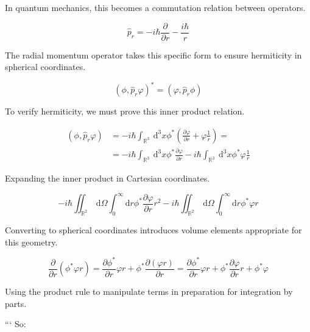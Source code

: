 \documentclass[italian]{HKNdocument}
\begin{document}
In quantum mechanics, this becomes a commutation relation between operators.

\begin{equation*}
\hat{p}_{r}=-i \hbar \frac{\partial}{\partial r}-\frac{i \hbar}{r} \tag{9.16}
\end{equation*}

The radial momentum operator takes this specific form to ensure hermiticity in spherical coordinates.

\begin{equation*}
\left(\phi, \hat{p}_{r} \varphi\right)^{*}=\left(\varphi, \hat{p}_{r} \phi\right) \tag{9.17}
\end{equation*}

To verify hermiticity, we must prove this inner product relation.

\begin{align*}
\left(\phi, \hat{p}_{r} \varphi\right) & =-i \hbar \int_{\mathbb{R}^{3}} \mathrm{~d}^{3} x \phi^{*}\left(\frac{\partial \varphi}{\partial r}+\varphi \frac{1}{r}\right)=  \tag{9.18}\\
& =-i \hbar \int_{\mathbb{R}^{3}} \mathrm{~d}^{3} x \phi^{*} \frac{\partial \varphi}{\partial r}-i \hbar \int_{\mathbb{R}^{3}} \mathrm{~d}^{3} x \phi^{*} \varphi \frac{1}{r}
\end{align*}

Expanding the inner product in Cartesian coordinates.

\begin{equation*}
-i \hbar \iint_{\mathbb{R}^{2}} \mathrm{~d} \Omega \int_{0}^{\infty} \mathrm{d} r \phi^{*} \frac{\partial \varphi}{\partial r} r^{2}-i \hbar \iint_{\mathbb{R}^{2}} \mathrm{~d} \Omega \int_{0}^{\infty} \mathrm{d} r \phi^{*} \varphi r \tag{9.19}
\end{equation*}

Converting to spherical coordinates introduces volume elements appropriate for this geometry.

\begin{equation*}
\frac{\partial}{\partial r}\left(\phi^{*} \varphi r\right)=\frac{\partial \phi^{*}}{\partial r} \varphi r+\phi^{*} \frac{\partial(\varphi r)}{\partial r}=\frac{\partial \phi^{*}}{\partial r} \varphi r+\phi^{*} \frac{\partial \varphi}{\partial r} r+\phi^{*} \varphi \tag{9.20}
\end{equation*}

Using the product rule to manipulate terms in preparation for integration by parts.

```
So:
\end{document}
